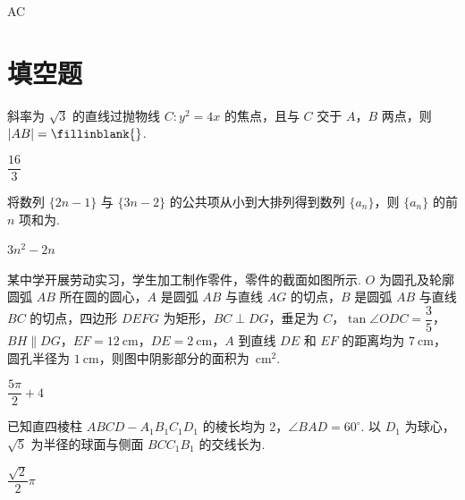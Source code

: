\begin{answer}
AC
\end{answer}

\section{填空题}

\begin{problem}
斜率为 \(\sqrt{3}\) 的直线过抛物线 \(C:y^2=4x\) 的焦点，且与 \(C\) 交于 \(A\)，\(B\) 两点，则 \(|AB|=\fillinblank{}\).
\end{problem}

\begin{answer}
\(\dfrac{16}{3}\)
\end{answer}

\begin{problem}
将数列 \(\{2n-1\}\) 与 \(\{3n-2\}\) 的公共项从小到大排列得到数列 \(\{a_n\}\)，则 \(\{a_n\}\) 的前 \(n\) 项和为\fillinblank{}.
\end{problem}

\begin{answer}
\(3n^2-2n\)
\end{answer}

\begin{problem}
某中学开展劳动实习，学生加工制作零件，零件的截面如图所示. \(O\) 为圆孔及轮廓圆弧 \(AB\) 所在圆的圆心，\(A\) 是圆弧 \(AB\) 与直线 \(AG\) 的切点，\(B\) 是圆弧 \(AB\) 与直线 \(BC\) 的切点，四边形 \(DEFG\) 为矩形，\(BC\perp DG\)，垂足为 \(C\)，\(\tan\angle ODC=\dfrac{3}{5}\)，\(BH\parallel DG\)，\(EF=12 \mathrm{~cm}\)，\(DE=2 \mathrm{~cm}\)，\(A\) 到直线 \(DE\) 和 \(EF\) 的距离均为 \(7 \mathrm{~cm}\)，圆孔半径为 \(1 \mathrm{~cm}\)，则图中阴影部分的面积为\fillinblank{}\ \(\mathrm{cm}^2\).

\end{problem}

\begin{answer}
\(\dfrac{5\pi}{2}+4\)
\end{answer}

\begin{problem}
已知直四棱柱 \(ABCD-A_1B_1C_1D_1\) 的棱长均为 2，\(\angle BAD=60^\circ\). 以 \(D_1\) 为球心，\(\sqrt{5}\) 为半径的球面与侧面 \(BCC_1B_1\) 的交线长为\fillinblank{}.
\end{problem}

\begin{answer}
\(\dfrac{\sqrt2}{2}\pi\)
\end{answer}

